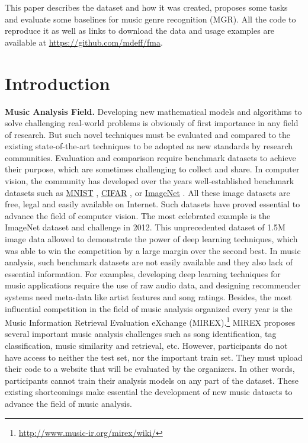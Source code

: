 \documentclass{article}
\begin{document}
This paper describes the dataset and how it was created, proposes some tasks and evaluate some baselines for music genre recognition (MGR).
All the code to reproduce it as well as links to download the data and usage examples are available at \url{https://github.com/mdeff/fma}.


\section{Introduction} %

\noindent
{\bf Music Analysis Field.} Developing new mathematical models and algorithms to solve challenging real-world problems is obviously of first importance in any field of research. But such novel techniques must be evaluated and compared to the existing state-of-the-art techniques to be adopted as new standards by research communities. Evaluation and comparison require benchmark datasets to achieve their purpose, which are sometimes challenging to collect and share. In computer vision, the community has developed over the years well-established benchmark datasets such as \href{http://yann.lecun.com/exdb/mnist/}{MNIST} \cite{mnist}, \href{https://www.cs.toronto.edu/~kriz/cifar.html}{CIFAR} \cite{cifar}, or \href{http://www.image-net.org}{ImageNet} \cite{imagenet}. All these image datasets are free, legal and easily available on Internet. Such datasets have proved essential to advance the field of computer vision. The most celebrated example is the ImageNet dataset and challenge in 2012. This unprecedented dataset of 1.5M image data allowed to demonstrate the power of deep learning techniques, which was able to win the competition by a large margin over the second best. In music analysis, such benchmark datasets are not easily available and they also lack of essential information. For examples, developing deep learning techniques for music applications require the use of raw audio data, and designing recommender systems need meta-data like artist features and song ratings. Besides, the most influential competition in the field of music analysis organized every year is the Music Information Retrieval Evaluation eXchange (MIREX).\footnote{\url{http://www.music-ir.org/mirex/wiki/}} MIREX proposes several important music analysis challenges such as song identification, tag classification, music similarity and retrieval, etc. However, participants do not have access to neither the test set, nor the important train set. They must upload their code to a website that will be evaluated by the organizers. In other words, participants cannot train their analysis models on any part of the dataset. These existing shortcomings make essential the development of new music datasets to advance the field of music analysis.   \\
\end{document}
